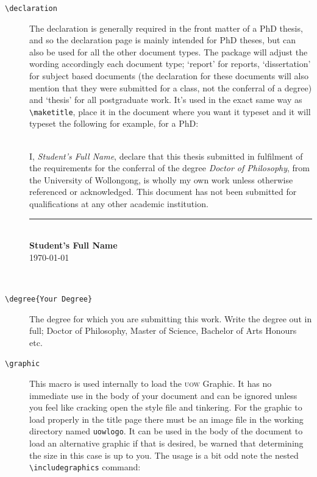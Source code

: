 \documentclass[12pt,oneside]{article}
\newcommand{\command}[1]{\texttt{\color{UOWred}#1}}
\newcommand{\comoptions}[1]{\texttt{\color{UOWdarkblue}#1}}
\begin{document}
\begin{description}
    \item[\command{\textbackslash{}declaration}] The declaration is generally required in the front matter of a PhD thesis, and so the declaration page is mainly intended for PhD theses, but can also be used for all the other document types. The package will adjust the wording accordingly each document type; `report' for reports, `dissertation' for subject based documents (the declaration for these documents will also mention that they were submitted for a class, not the conferral of a degree) and `thesis' for all postgraduate work. It's used in the exact same way as \command{\textbackslash{}maketitle}, place it in the document where you want it typeset and it will typeset the following for example, for a PhD:\\
    
\\

{\noindent I, \emph{Student's Full Name}, declare that this thesis submitted in fulfilment of the requirements for the conferral of the degree \emph{Doctor of Philosophy}, from the University of Wollongong, is wholly my own work unless otherwise referenced or acknowledged. This document has not been submitted for qualifications at any other academic institution.\par
\vspace{1cm}
\noindent\rule{0.4\textwidth}{0.5pt}
\vspace{1ex}\\
\textbf{Student's Full Name}\\
\today}\\

    \item[\command{\textbackslash{}degree}\comoptions{\{Your Degree\}}] The degree for which you are submitting this work. Write the degree out in full; Doctor of Philosophy, Master of Science, Bachelor of Arts Honours etc.
    
    \item[\command{\textbackslash{}graphic}] This macro is used internally to load the \textsc{uow} Graphic. It has no immediate use in the body of your document and can be ignored unless you feel like cracking open the style file and tinkering. For the graphic to load properly in the title page there must be an image file in the working directory named \texttt{uow\textunderscore{}logo}. It can be used in the body of the document to load an alternative graphic if that is desired, be warned that determining the size in this case is up to you.
    The usage is a bit odd note the nested \command{\textbackslash{}includegraphics} command:
    

\end{description}
\end{document}
